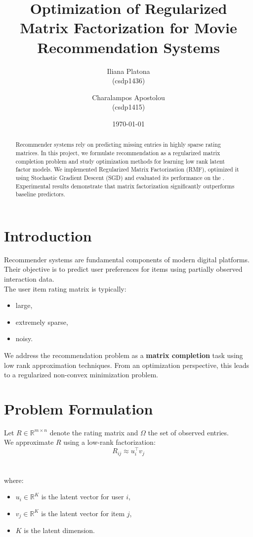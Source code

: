 \documentclass[10pt,twocolumn]{article}
\title{Optimization of Regularized Matrix Factorization for Movie Recommendation Systems}
\author{Iliana Platona\\(csdp1436)\and Charalampos Apostolou\\(csdp1415)}
\date{\today}
\begin{document}
\maketitle

\begin{abstract}
Recommender systems rely on predicting missing entries in highly sparse rating matrices. 
In this project, we formulate recommendation as a regularized matrix completion problem and study optimization methods for learning low rank latent factor models. 
We implemented Regularized Matrix Factorization (RMF), optimized it using Stochastic Gradient Descent (SGD) and evaluated its performance on the . 
Experimental results demonstrate that matrix factorization significantly outperforms baseline predictors. 
\end{abstract}

\section{Introduction}
Recommender systems are fundamental components of modern digital platforms. 
Their objective is to predict user preferences for items using partially observed interaction data.\\
The user item rating matrix is typically:
\begin{itemize}
    \item large,
    \item extremely sparse,
    \item noisy.
\end{itemize}
We address the recommendation problem as a \textbf{matrix completion} task using low rank approximation techniques. 
From an optimization perspective, this leads to a regularized non-convex minimization problem.

\section{Problem Formulation}
Let $R \in \mathbb{R}^{m \times n}$ denote the rating matrix and $\Omega$ the set of observed entries.\\
We approximate $R$ using a low-rank factorization:
\begin{equation}                    %
R_{ij} \approx u_i^\top v_j
\end{equation}
\\
\\where:                            %
\begin{itemize}
    \item $u_i \in \mathbb{R}^K$ is the latent vector for user $i$,
    \item $v_j \in \mathbb{R}^K$ is the latent vector for item $j$,
    \item $K$ is the latent dimension.
\end{itemize}
\end{document}
